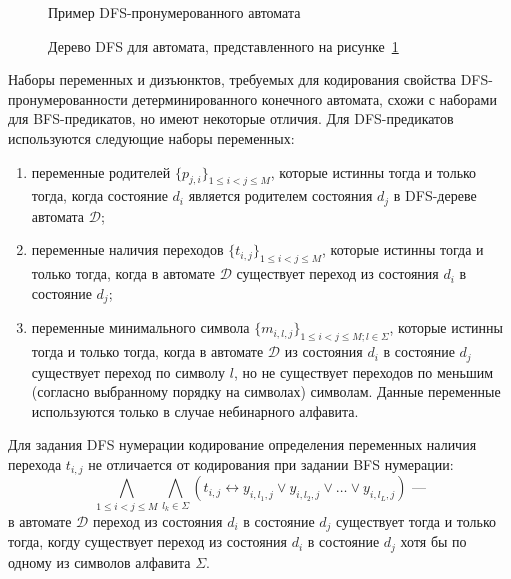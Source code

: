 \begin{figure}[ht]
  \centering
  \ifafour
    
  \else
    
  \fi
  \caption{Пример DFS-пронумерованного автомата}
  \label{img:dfs-ex}
\end{figure}

\begin{figure}[ht]
  \centering
  \ifafour
    
  \else
    
  \fi
  \caption{Дерево DFS для автомата, представленного на рисунке~\ref{img:dfs-ex}}
  \label{img:dfs-tree-ex}
\end{figure}

Наборы переменных и дизъюнктов, требуемых для кодирования свойства DFS-пронумерованности детерминированного конечного автомата, схожи с наборами для BFS-предикатов, но имеют некоторые отличия.
Для DFS-предикатов используются следующие наборы переменных:
\begin{enumerate}
  \item переменные родителей $\{p_{j,i}\}_{1 \leq i < j \leq M}$, которые истинны тогда и только тогда, когда состояние $d_i$ является родителем состояния $d_j$ в DFS-дереве автомата $\mathcal{D}$;
  \item переменные наличия переходов $\{t_{i,j}\}_{1 \leq i < j \leq M}$, которые истинны тогда и только тогда, когда в автомате $\mathcal{D}$ существует переход из состояния $d_{i}$ в состояние $d_{j}$;
  \item переменные минимального символа $\{m_{i,l,j}\}_{1 \leq i < j \leq M;l \in \Sigma}$, которые истинны тогда и только тогда, когда в автомате $\mathcal{D}$ из состояния $d_{i}$ в состояние $d_{j}$ существует переход по символу $l$, но не существует переходов по меньшим (согласно выбранному порядку на символах) символам.
  Данные переменные используются только в случае небинарного алфавита.
\end{enumerate}

Для задания DFS нумерации кодирование определения переменных наличия перехода $t_{i,j}$ не отличается от кодирования при задании BFS нумерации:
\begin{equation*}
  \bigwedge_{1 \leq i < j \leq M} \bigwedge_{l_{k} \in \Sigma} \left(t_{i,j} \leftrightarrow y_{i,l_{1},j} \vee y_{i,l_{2},j} \vee \ldots \vee y_{i,l_{L},j} \right)\text{~---}
\end{equation*}
в автомате $\mathcal{D}$ переход из состояния $d_{i}$ в состояние $d_{j}$ существует тогда и только тогда, когду существует переход из состояния $d_{i}$ в состояние $d_{j}$ хотя бы по одному из символов алфавита $\Sigma$.

